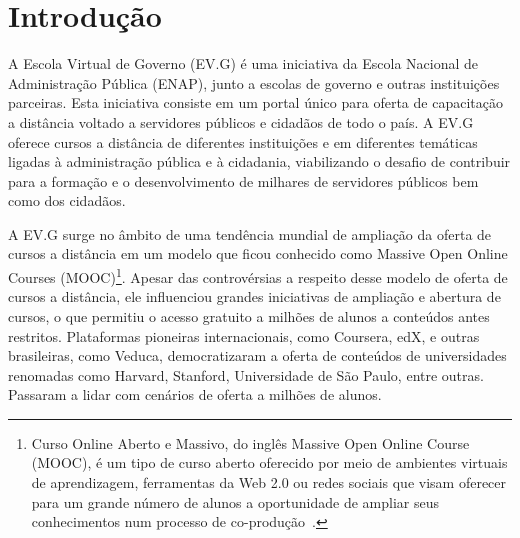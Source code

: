 %
%
%
%

\chapter{Introdução}

A Escola Virtual de Governo (EV.G) é uma iniciativa da Escola Nacional de Administração Pública (ENAP), junto a escolas de governo e outras instituições parceiras.
Esta iniciativa consiste em um portal único para oferta de capacitação a distância voltado a servidores públicos e cidadãos de todo o país.
A EV.G oferece cursos a distância de diferentes instituições e em diferentes temáticas ligadas à administração pública e à cidadania, viabilizando o desafio de contribuir para a formação e o desenvolvimento de milhares de servidores públicos bem como dos cidadãos.

A EV.G surge no âmbito de uma tendência mundial de ampliação da oferta de cursos a distância em um modelo que ficou conhecido como Massive Open Online Courses (MOOC)\footnote{Curso Online Aberto e Massivo, do inglês Massive Open Online Course (MOOC), é um tipo de curso aberto oferecido por meio de ambientes virtuais de aprendizagem, ferramentas da Web 2.0 ou redes sociais que visam oferecer para um grande número de alunos a oportunidade de ampliar seus conhecimentos num processo de co-produção~\cite{Mooc}.}. Apesar das controvérsias a respeito desse modelo de oferta de cursos a distância, ele influenciou grandes iniciativas de ampliação e abertura de cursos, o que permitiu o acesso gratuito a milhões de alunos a conteúdos antes restritos. Plataformas pioneiras internacionais, como Coursera, edX, e outras brasileiras, como Veduca, democratizaram a oferta de conteúdos de universidades renomadas como Harvard, Stanford, Universidade de São Paulo, entre outras. Passaram a lidar com cenários de oferta a milhões de alunos. 

